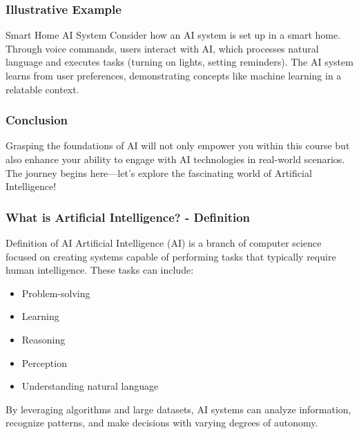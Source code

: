 \documentclass[aspectratio=169]{beamer}
\begin{document}
\begin{frame}[fragile]
    \frametitle{Illustrative Example}
    \begin{block}{Smart Home AI System}
        Consider how an AI system is set up in a smart home. Through voice commands, users interact with AI, which processes natural language and executes tasks (turning on lights, setting reminders). The AI system learns from user preferences, demonstrating concepts like machine learning in a relatable context.
    \end{block}
\end{frame}

\begin{frame}[fragile]
    \frametitle{Conclusion}
    Grasping the foundations of AI will not only empower you within this course but also enhance your ability to engage with AI technologies in real-world scenarios. The journey begins here—let's explore the fascinating world of Artificial Intelligence!
\end{frame}

\begin{frame}[fragile]
    \frametitle{What is Artificial Intelligence? - Definition}
    \begin{block}{Definition of AI}
        Artificial Intelligence (AI) is a branch of computer science focused on creating systems capable of performing tasks that typically require human intelligence. These tasks can include:
    \end{block}
    \begin{itemize}
        \item Problem-solving
        \item Learning
        \item Reasoning
        \item Perception
        \item Understanding natural language
    \end{itemize}
    By leveraging algorithms and large datasets, AI systems can analyze information, recognize patterns, and make decisions with varying degrees of autonomy.
\end{frame}
\end{document}
